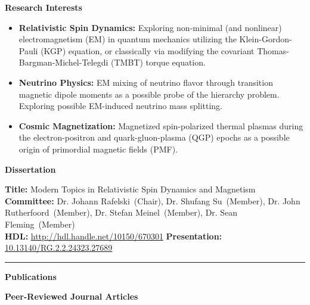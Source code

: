 \documentclass[11pt]{article}
\begin{document}
\medskip

{\Large\textbf{Research Interests}}

\begin{itemize}[leftmargin=*,nosep]
    \item \textbf{Relativistic Spin Dynamics:} Exploring non-minimal (and nonlinear) electromagnetism (EM) in quantum mechanics utilizing the Klein-Gordon-Pauli (KGP) equation, or classically via modifying the covariant Thomas-Bargman-Michel-Telegdi (TMBT) torque equation.
    \item \textbf{Neutrino Physics:} EM mixing of neutrino flavor through transition magnetic dipole moments as a possible probe of the hierarchy problem. Exploring possible EM-induced neutrino mass splitting.
    \item \textbf{Cosmic Magnetization:} Magnetized spin-polarized thermal plasmas during the electron-positron and quark-gluon-plasma (QGP) epochs as a possible origin of primordial magnetic fields (PMF).
\end{itemize}

\medskip

{\Large\textbf{Dissertation}}

\textbf{Title:} Modern Topics in Relativistic Spin Dynamics and Magnetism\\[0.3em]
\textbf{Committee:} Dr. Johann Rafelski~(Chair), Dr. Shufang Su~(Member), Dr. John Rutherfoord~(Member), Dr. Stefan Meinel~(Member), Dr. Sean Fleming~(Member)\\[0.3em]
\textbf{HDL:} \href{http://hdl.handle.net/10150/670301}{http://hdl.handle.net/10150/670301} \textbf{Presentation:} \href{http://dx.doi.org/10.13140/RG.2.2.24323.27689}{10.13140/RG.2.2.24323.27689}

\noindent\rule{\linewidth}{1.0pt}

{\Large\textbf{Publications}}

{\large\textbf{Peer-Reviewed Journal Articles}}
\end{document}
